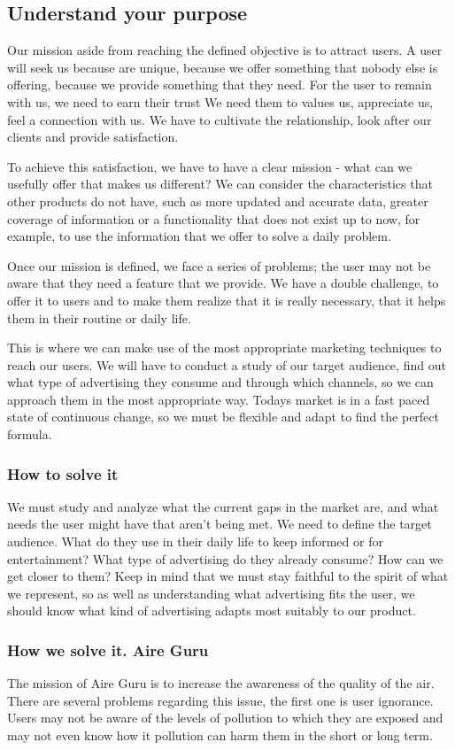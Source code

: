 \subsection{Understand your purpose}
Our mission aside from reaching the defined objective is to attract users.
A user will seek us because are unique, because we offer something that
nobody else is offering, because we provide something that they need.
For the user to remain with us, we need to earn their trust We need them to values us, appreciate us, feel a connection with us.
We have to cultivate the relationship, look after our clients and provide satisfaction.

To achieve this satisfaction, we have to have a clear mission - what can we usefully offer that makes us different?
We can consider the characteristics that other products do not have, such as more updated and accurate data,
greater coverage of information or a functionality that does not exist up to now, for example, to use the
information that we offer to solve a daily problem.

Once our mission is defined, we face a series of problems; the user may not be aware that they need a feature that we provide. We have a double challenge, to offer it to users and
to make them realize that it is really necessary, that it helps them in their routine or daily life.

This is where we can make use of the most appropriate marketing techniques to reach our users.
We will have to conduct a study of our target audience, find out what type of advertising they consume and through which channels, so we can approach them in the most appropriate way. Todays market is in a fast paced state of continuous change,
so we must be flexible and adapt to find the perfect formula.

\subsubsection*{How to solve it} 
We must study and analyze what the current gaps in the market are, and what needs the user might have that aren't being met.
We need to define the target audience. What do they use in their daily life to keep informed or for entertainment? What type of advertising do they already consume? How can we get closer to them? Keep in mind that we must stay
faithful to the spirit of what we represent, so as well as understanding what advertising fits the user, we should know what kind of advertising
adapts most suitably to our product.
\subsubsection*{How we solve it. Aire Guru} 
The mission of Aire Guru is to increase the awareness of the quality of the air.
There are several problems regarding this issue, the first one is user ignorance. Users may not be
aware of the levels of pollution to which they are exposed and may not even know how it pollution can harm them
in the short or long term.

